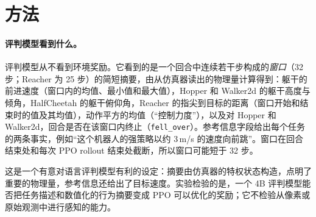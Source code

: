 \begin{table}[t]
\centering\footnotesize

\caption{两个评判模型读到的各任务文本（评判模型读的是英文原文）。每个请求还包含该窗口的摘要（\S\ref{sec:method} 所列各物理量）。\texttt{progress} 问题（“”）有五个随任务而定的等级，从 \emph{failing} 到 \emph{excellent}；全部内容见 。}
\label{tab:prompts}
\end{table}

\section{方法}\label{sec:method}

\paragraph{评判模型看到什么。} 评判模型从不看到环境奖励。它看到的是一个回合中连续若干步构成的\emph{窗口}（32 步；Reacher 为 25 步）的简短摘要，由从仿真器读出的物理量计算得到：躯干的前进速度（窗口内的均值、最小值和最大值），Hopper 和 Walker2d 的躯干高度与倾角，HalfCheetah 的躯干俯仰角，Reacher 的指尖到目标的距离（窗口开始和结束时的值及其均值），动作平方的均值（“控制力度”），以及对 Hopper 和 Walker2d，回合是否在该窗口内终止（\texttt{fell\_over}）。参考信息字段给出每个任务的两条事实，例如“这个机器人的强策略以约 3\,m/s 的速度向前跳”。窗口在回合结束处和每次 PPO rollout 结束处截断，所以窗口可能短于 32 步。

这是一个有意对语言评判模型有利的设定：摘要由仿真器的特权状态构造，点明了重要的物理量，参考信息还给出了目标速度。实验检验的是，一个 4B 评判模型能否把任务描述和数值化的行为摘要变成 PPO 可以优化的奖励；它不检验从像素或原始观测中进行感知的能力。


